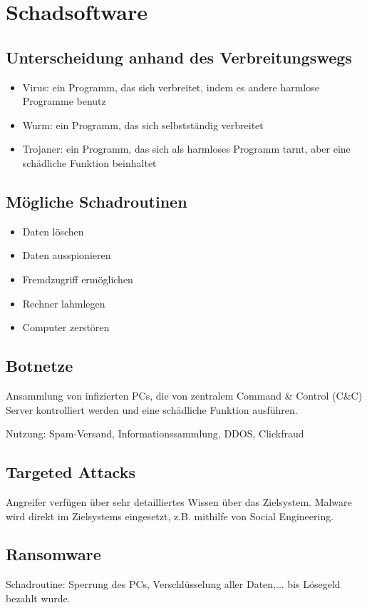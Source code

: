 \section{Schadsoftware}
\subsection{Unterscheidung anhand des Verbreitungswegs}
\begin{itemize}
    \item Virus: ein Programm, das sich verbreitet, indem es andere harmlose Programme benutz
    \item Wurm: ein Programm, das sich selbstständig verbreitet
    \item Trojaner: ein Programm, das sich als harmloses Programm tarnt, aber eine schädliche Funktion beinhaltet
\end{itemize}

\subsection{Mögliche Schadroutinen}
\begin{itemize}
    \item Daten löschen
    \item Daten ausspionieren
    \item Fremdzugriff ermöglichen
    \item Rechner lahmlegen
    \item Computer zerstören
\end{itemize}

\subsection{Botnetze}
Ansammlung von infizierten PCs, die von zentralem Command \& Control (C\&C) Server kontrolliert werden 
und eine schädliche Funktion ausführen.

\vspace{.3cm}

Nutzung: Spam-Versand, Informationssammlung, DDOS, Clickfraud

\subsection{Targeted Attacks}
Angreifer verfügen über sehr detailliertes Wissen über das Zielsystem. Malware wird direkt im Zielsystems eingesetzt, z.B. mithilfe von Social Engineering.

\subsection{Ransomware}
Schadroutine: Sperrung des PCs, Verschlüsselung aller Daten,... bis Lösegeld bezahlt wurde.

